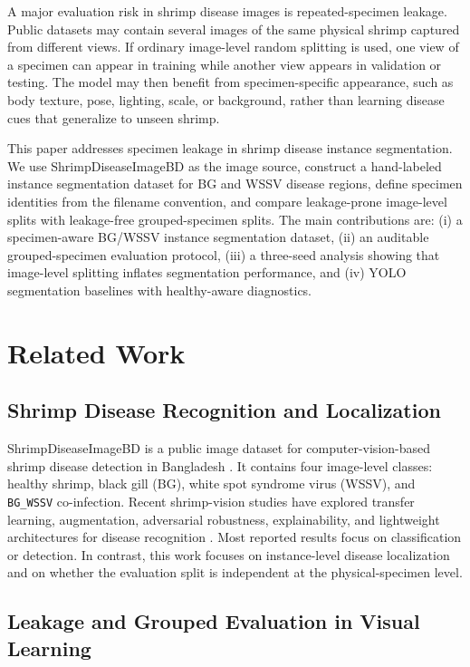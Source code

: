 \documentclass{svproc}
\begin{document}
A major evaluation risk in shrimp disease images is repeated-specimen leakage. Public datasets may contain several images of the same physical shrimp captured from different views. If ordinary image-level random splitting is used, one view of a specimen can appear in training while another view appears in validation or testing. The model may then benefit from specimen-specific appearance, such as body texture, pose, lighting, scale, or background, rather than learning disease cues that generalize to unseen shrimp.

This paper addresses specimen leakage in shrimp disease instance segmentation. We use ShrimpDiseaseImageBD \cite{islam2025shrimpdiseaseimagebd} as the image source, construct a hand-labeled instance segmentation dataset for BG and WSSV disease regions, define specimen identities from the filename convention, and compare leakage-prone image-level splits with leakage-free grouped-specimen splits. The main contributions are: (i) a specimen-aware BG/WSSV instance segmentation dataset, (ii) an auditable grouped-specimen evaluation protocol, (iii) a three-seed analysis showing that image-level splitting inflates segmentation performance, and (iv) YOLO segmentation baselines with healthy-aware diagnostics.

\section{Related Work}

\subsection{Shrimp Disease Recognition and Localization}

ShrimpDiseaseImageBD is a public image dataset for computer-vision-based shrimp disease detection in Bangladesh \cite{islam2025shrimpdiseaseimagebd}. It contains four image-level classes: healthy shrimp, black gill (BG), white spot syndrome virus (WSSV), and \texttt{BG\_WSSV} co-infection. Recent shrimp-vision studies have explored transfer learning, augmentation, adversarial robustness, explainability, and lightweight architectures for disease recognition \cite{jone2026shrimpxnet,fei2025lightweight}. Most reported results focus on classification or detection. In contrast, this work focuses on instance-level disease localization and on whether the evaluation split is independent at the physical-specimen level.

\subsection{Leakage and Grouped Evaluation in Visual Learning}
\end{document}
